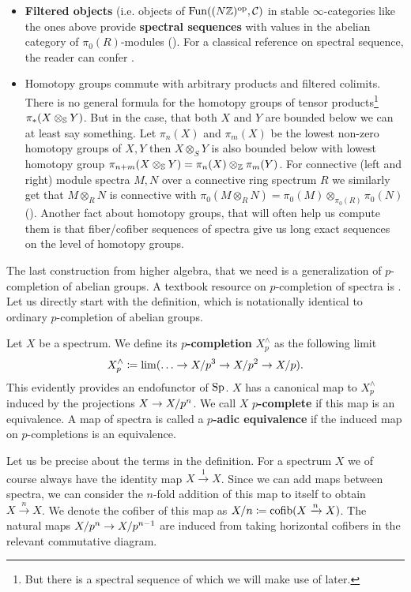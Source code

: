 \begin{itemize}
    \item \textbf{Filtered objects} (i.e. objects of $\Fun((N\Z)^{\op},\cC)$ in stable $\infty$-categories like the ones above provide \textbf{spectral sequences} with values in the abelian category of $\pi_0(R)$-modules (\cite[Section~1.2.2]{lurie2017higher}). For a classical reference on spectral sequence, the reader can confer \cite[Chapter~5]{weibel1994introduction}.
    \item Homotopy groups commute with arbitrary products and filtered colimits. There is no general formula for the homotopy groups of tensor products\footnote{But there is a spectral sequence of which we will make use of later.} $\pi_*(X\otimes_\S Y)$. 
    But in the case, that both $X$ and $Y$ are bounded below we can at least say something. Let $\pi_n(X)$ and $\pi_m(X)$ be the lowest non-zero homotopy groups of $X,Y$ then $X\otimes_S Y$ is also bounded below with lowest homotopy group $\pi_{n+m}(X\otimes_\S Y)=\pi_n(X)\otimes_\Z\pi_m(Y)$. 
    For connective (left and right) module spectra $M,N$ over a connective ring spectrum $R$ we similarly get that $M\otimes_R N$ is connective with $\pi_0(M\otimes_R N)=\pi_0(M)\otimes_{\pi_0(R)}\pi_0(N)$ (\cite[Corollary~7.2.1.23]{lurie2017higher}). Another fact about homotopy groups, that will often help us compute them is that fiber/cofiber sequences of spectra give us long exact sequences on the level of homotopy groups.

\end{itemize}
The last construction from higher algebra, that we need is a generalization of $p$-completion of abelian groups. A textbook resource on $p$-completion of spectra is \cite[Section~8.4.1]{barnesroitzheimfoundation}.
Let us directly start with the definition, which is notationally identical to ordinary $p$-completion of abelian groups.
\begin{defn}
    Let $X$ be a spectrum. We define its \textbf{$p$-completion} $X^\wedge_p$ as the following limit
    \begin{equation*}
        X^\wedge_p\coloneqq \lim (\dots\ra X/p^3\ra X/p^2\ra X/p).
    \end{equation*}
    This evidently provides an endofunctor of $\Sp$.
    $X$ has a canonical map to $X^\wedge_p$ induced by the projections $X\ra X/p^n$. We call $X$ \textbf{$p$-complete} if this map is an equivalence. A map of spectra is called a \textbf{$p$-adic equivalence} if the induced map on $p$-completions is an equivalence.  
\end{defn}
Let us be precise about the terms in the definition. For a spectrum $X$ we of course always have the identity map $X\xrightarrow{1}X$. Since we can add maps between spectra, we can consider the $n$-fold addition of this map to itself to obtain $X\xrightarrow{n}X$. We denote the cofiber of this map as $X/n\coloneqq \cofib(X\xrightarrow{n}X)$. The natural maps $X/p^n\ra X/p^{n-1}$ are induced from taking horizontal cofibers in the relevant commutative diagram.
